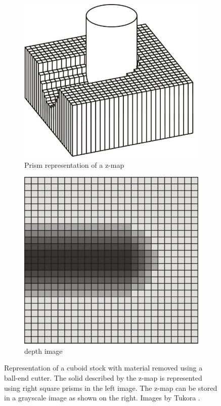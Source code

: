 \begin{description}
	\begin{figure}[H]
		\centering
		\begin{subfigure}[b]{0.4\textwidth}
			\centering
			\includegraphics[width=\textwidth]{images/zmap}
			\caption{Prism representation of a z-map}
			\label{fig:zmap}
		\end{subfigure}
		\begin{subfigure}[b]{0.4\textwidth}
			\centering
			\includegraphics[width=\textwidth]{images/depth_image}
			\caption{depth image}
			\label{fig:depth_image}
		\end{subfigure}
		\caption{
			Representation of a cuboid stock with material removed using a ball-end cutter.
			The solid described by the z-map is represented using right square prisms in the left image.
			The z-map can be stored in a grayscale image as shown on the right.
			Images by Tukora \cite{virtual_machining_review}.
		}
	\end{figure}
	


\end{description}
